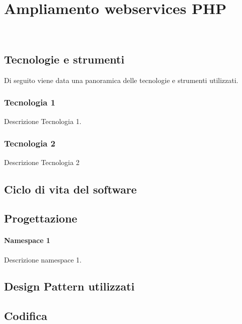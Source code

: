 
\chapter{Ampliamento webservices PHP}
\label{cap:webservices}

\\

\section{Tecnologie e strumenti}
\label{sec:tecnologie-strumenti}

Di seguito viene data una panoramica delle tecnologie e strumenti utilizzati.

\subsection*{Tecnologia 1}
Descrizione Tecnologia 1.

\subsection*{Tecnologia 2}
Descrizione Tecnologia 2

\section{Ciclo di vita del software}
\label{sec:ciclo-vita-software}

\section{Progettazione}
\label{sec:progettazione}

\subsubsection{Namespace 1} %
Descrizione namespace 1.

\begin{namespacedesc}
\end{namespacedesc}


\section{Design Pattern utilizzati}

\section{Codifica}
